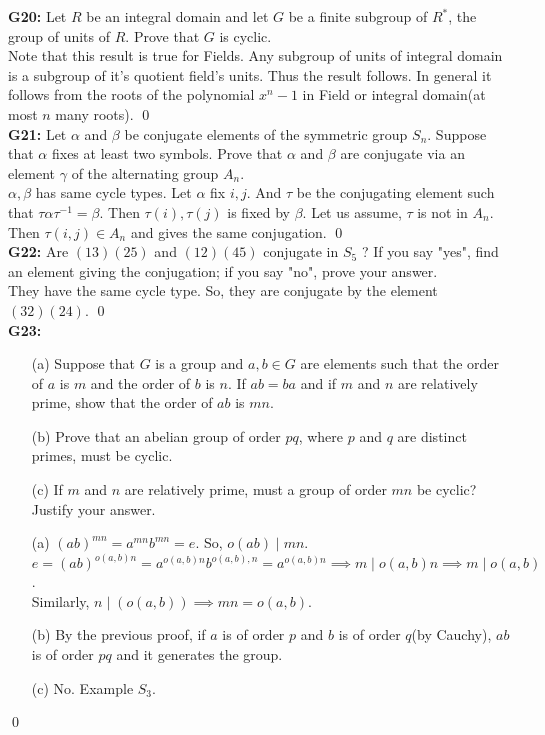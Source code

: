 \textbf{G20:} Let $R$ be an integral domain and let $G$ be a finite subgroup of $R^{*}$, the group of units of $R$. Prove that $G$ is cyclic.\\
\soln
Note that this result is true for Fields. Any subgroup of units of integral domain is a subgroup of it's quotient field's units. Thus the result follows. In general it follows from the roots of the polynomial $ x^n-1 $ in Field or integral domain(at most $ n $ many roots).
\qed\\

\textbf{G21:} Let $\alpha$ and $\beta$ be conjugate elements of the symmetric group $S_{n}$. Suppose that $\alpha$ fixes at least two symbols. Prove that $\alpha$ and $\beta$ are conjugate via an element $\gamma$ of the alternating group $A_{n}$.\\

\soln
$ \alpha,\beta  $ has same cycle types. Let $ \alpha $ fix $ i,j $. And $ \tau $ be the conjugating element such that $ \tau\alpha\tau^{-1} =\beta$. Then $ \tau(i),\tau(j) $ is fixed by $ \beta $. Let us assume, $ \tau $ is not in $ A_n $. Then $ \tau (i,j)\in A_n $ and gives the same conjugation. 
\qed\\

\textbf{G22:} Are $(13)(25)$ and $(12)(45)$ conjugate in $S_{5}$ ? If you say "yes", find an element giving the conjugation; if you say "no", prove your answer.\\

\soln
They have the same cycle type. So, they are conjugate by the element $ (3 2)(2 4) $.
\qed\\

\textbf{G23:} 
\begin{itemize}
	\item[(a)] Suppose that $G$ is a group and $a, b \in G$ are elements such that the order of $a$ is $m$ and the order of $b$ is $n$. If $a b=b a$ and if $m$ and $n$ are relatively prime, show that the order of $a b$ is $m n$.
	\item[(b)] Prove that an abelian group of order $p q$, where $p$ and $q$ are distinct primes, must be cyclic.
	\item[(c)] If $m$ and $n$ are relatively prime, must a group of order $m n$ be cyclic? Justify your answer.
\end{itemize}
\soln
\begin{itemize}
	\item[(a)] $ (ab)^{mn}= a^{mn}b^{mn}=e $. So, $ o(ab)\mid mn$.\\
	$ e=(ab)^{o(a,b)n}=a^{o(a,b)n}b^{o(a,b),n}=a^{o(a,b)n} \implies m\mid o(a,b)n\implies m\mid o(a,b)$.\\
	Similarly, $ n\mid(o(a,b)) \implies mn=o(a,b)$.
	\item[(b)] By the previous proof, if $ a $ is of order $ p $ and $ b $ is of order $ q $(by Cauchy), $ ab $ is of order $ pq $ and it generates the group.
	\item[(c)] No. Example $ S_3 $. 
\end{itemize}
\qed\\

